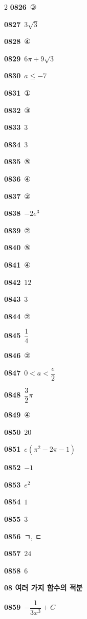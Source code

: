\documentclass[10pt,a4paper]{article}
\begin{document}
\begin{multicols}{2}
\noindent\textbf{0826}\ ③\par
\noindent\textbf{0827}\ $3\sqrt{3}$\par
\noindent\textbf{0828}\ ④\par
\noindent\textbf{0829}\ $6\pi+9\sqrt{3}$\par
\noindent\textbf{0830}\ $a\le -7$\par
\noindent\textbf{0831}\ ①\par
\noindent\textbf{0832}\ ③\par
\noindent\textbf{0833}\ $3$\par
\noindent\textbf{0834}\ $3$\par
\noindent\textbf{0835}\ ⑤\par
\noindent\textbf{0836}\ ④\par
\noindent\textbf{0837}\ ②\par
\noindent\textbf{0838}\ $-2e^3$\par
\noindent\textbf{0839}\ ②\par
\noindent\textbf{0840}\ ⑤\par
\noindent\textbf{0841}\ ④\par
\noindent\textbf{0842}\ $12$\par
\noindent\textbf{0843}\ $3$\par
\noindent\textbf{0844}\ ②\par
\noindent\textbf{0845}\ $\dfrac{1}{4}$\par
\noindent\textbf{0846}\ ②\par
\noindent\textbf{0847}\ $0<a<\dfrac{e}{2}$\par
\noindent\textbf{0848}\ $\dfrac{3}{2}\pi$\par
\noindent\textbf{0849}\ ④\par
\noindent\textbf{0850}\ $20$\par
\noindent\textbf{0851}\ $e(\pi^2-2\pi-1)$\par
\noindent\textbf{0852}\ $-1$\par
\noindent\textbf{0853}\ $e^2$\par
\noindent\textbf{0854}\ $1$\par
\noindent\textbf{0855}\ $3$\par
\noindent\textbf{0856}\ ㄱ, ㄷ\par
\noindent\textbf{0857}\ $24$\par
\noindent\textbf{0858}\ $6$\par
\noindent\textbf{08 여러 가지 함수의 적분}\par\smallskip
\noindent\textbf{0859}\ $-\dfrac{1}{3x^3}+C$\par

\end{multicols}
\end{document}
